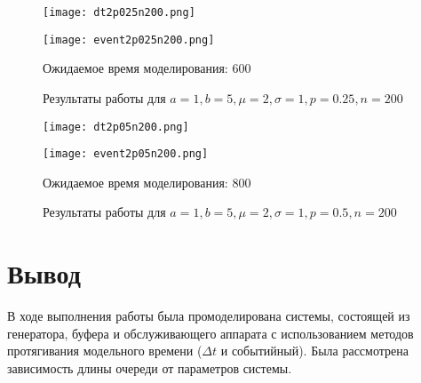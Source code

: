 \begin{figure}[h]
    \begin{minipage}{0.45\textwidth}
        \texttt{[image: dt2p025n200.png]}
    \end{minipage}
    \hfill
    \begin{minipage}{0.45\textwidth}
        \texttt{[image: event2p025n200.png]}
    \end{minipage}
    \begin{center}
        Ожидаемое время моделирования: 600
    \end{center}
    \caption{Результаты работы для $a=1, b=5, \mu=2, \sigma=1, p=0.25, n=200$}
\end{figure}

\begin{figure}[h]
    \begin{minipage}{0.45\textwidth}
        \texttt{[image: dt2p05n200.png]}
    \end{minipage}
    \hfill
    \begin{minipage}{0.45\textwidth}
        \texttt{[image: event2p05n200.png]}
    \end{minipage}
    \begin{center}
        Ожидаемое время моделирования: 800
    \end{center}
    \caption{Результаты работы для $a=1, b=5, \mu=2, \sigma=1, p=0.5, n=200$}
\end{figure}


\clearpage

\section*{Вывод}

В ходе выполнения работы была промоделирована системы, состоящей из генератора,
буфера и обслуживающего аппарата с использованием методов протягивания
модельного времени ($\Delta t$ и событийный). Была рассмотрена зависимость длины
очереди от параметров системы.

